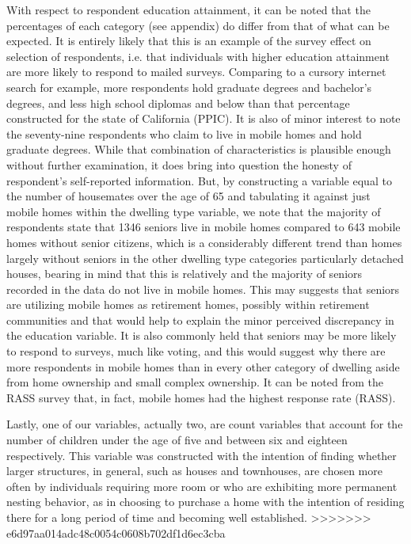 \documentclass{article}
\begin{document}
	With respect to respondent education attainment, it can be noted that the percentages of each category (see appendix) do differ from that of what can be expected.  It is entirely likely that this is an example of the survey effect on selection of respondents, i.e. that individuals with higher education attainment are more likely to respond to mailed surveys.  Comparing to a cursory internet search for example, more respondents hold graduate degrees and bachelor’s degrees, and less high school diplomas and below than that percentage constructed for the state of California (PPIC).  It is also of minor interest to note the seventy-nine respondents who claim to live in mobile homes and hold graduate degrees.  While that combination of characteristics is plausible enough without further examination, it does bring into question the honesty of respondent’s self-reported information.  But, by constructing a variable equal to the number of housemates over the age of 65 and tabulating it against just mobile homes within the dwelling type variable, we note that the majority of respondents state that 1346 seniors live in mobile homes compared to 643 mobile homes without senior citizens, which is a considerably different trend than homes largely without seniors in the other dwelling type categories particularly detached houses, bearing in mind that this is relatively and the majority of seniors recorded in the data do not live in mobile homes. This may suggests that seniors are utilizing mobile homes as retirement homes, possibly within retirement communities and that would help to explain the minor perceived discrepancy in the education variable.  It is also commonly held that seniors may be more likely to respond to surveys, much like voting, and this would suggest why there are more respondents in mobile homes than in every other category of dwelling aside from home ownership and small complex ownership.  It can be noted from the RASS survey that, in fact, mobile homes had the highest response rate (RASS).
	
Lastly, one of our variables, actually two, are count variables that account for the number of children under the age of five and between six and eighteen respectively.  This variable was constructed with the intention of finding whether larger structures, in general, such as houses and townhouses, are chosen more often by individuals requiring more room or who are exhibiting more permanent nesting behavior, as in choosing to purchase a home with the intention of residing there for a long period of time and becoming well established.
>>>>>>> e6d97aa014adc48c0054c0608b702df1d6ec3cba
\end{document}
